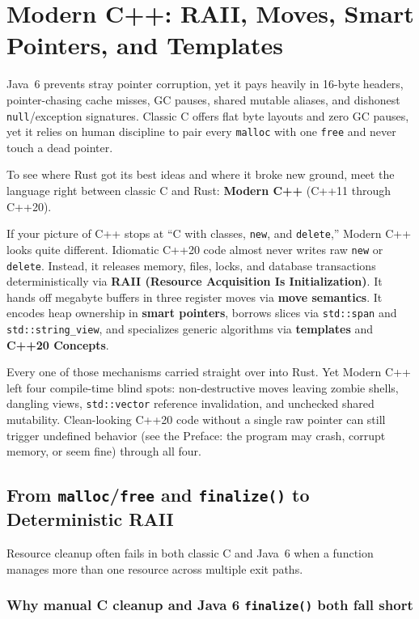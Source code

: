 \chapter{Modern C++: RAII, Moves, Smart Pointers, and Templates}
\label{ch:modern-cpp}

Java~6 prevents stray pointer corruption, yet it pays heavily in 16-byte headers, pointer-chasing cache misses, GC pauses, shared mutable aliases, and dishonest \texttt{null}/exception signatures. Classic C offers flat byte layouts and zero GC pauses, yet it relies on human discipline to pair every \texttt{malloc} with one \texttt{free} and never touch a dead pointer.

To see where Rust got its best ideas and where it broke new ground, meet the language right between classic C and Rust: \textbf{Modern C++} (C++11 through C++20).

If your picture of C++ stops at ``C with classes, \texttt{new}, and \texttt{delete},'' Modern C++ looks quite different. Idiomatic C++20 code almost never writes raw \texttt{new} or \texttt{delete}. Instead, it releases memory, files, locks, and database transactions deterministically via \textbf{RAII (Resource Acquisition Is Initialization)}. It hands off megabyte buffers in three register moves via \textbf{move semantics}. It encodes heap ownership in \textbf{smart pointers}, borrows slices via \texttt{std::span} and \texttt{std::string\_view}, and specializes generic algorithms via \textbf{templates} and \textbf{C++20 Concepts}.

Every one of those mechanisms carried straight over into Rust. Yet Modern C++ left four compile-time blind spots: non-destructive moves leaving zombie shells, dangling views, \texttt{std::vector} reference invalidation, and unchecked shared mutability. Clean-looking C++20 code without a single raw pointer can still trigger undefined behavior (see the Preface: the program may crash, corrupt memory, or seem fine) through all four. 

\chapterline

\section{From \texttt{malloc}/\texttt{free} and \texttt{finalize()} to Deterministic RAII}
\label{ch02:raii}

Resource cleanup often fails in both classic C and Java~6 when a function manages more than one resource across multiple exit paths.

\subsection{Why manual C cleanup and Java 6 \texttt{finalize()} both fall short}

